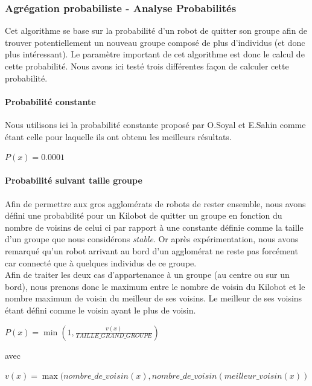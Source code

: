 \documentclass[a4paper]{article}
\begin{document}
\subsubsection{Agrégation probabiliste - Analyse Probabilités}
Cet algorithme se base sur la probabilité d'un robot de quitter son groupe afin de trouver potentiellement un nouveau groupe composé de plus d'individus (et donc plus intéressant). Le paramètre important de cet algorithme est donc le calcul de cette probabilité. Nous avons ici testé trois différentes façon de calculer cette probabilité.
\paragraph{Probabilité constante} Nous utilisons ici la probabilité constante proposé par O.Soyal et E.Sahin comme étant celle pour laquelle ils ont obtenu les meilleurs résultats.
\begin{center}
	$P(x)=0.0001$
\end{center}
\paragraph{Probabilité suivant taille groupe} Afin de permettre aux gros agglomérats de robots de rester ensemble, nous avons défini une probabilité pour un Kilobot de quitter un groupe en fonction du nombre de voisins de celui ci par rapport à une constante définie comme la taille d'un groupe que nous considérons \textit{stable}. Or après expérimentation, nous avons remarqué qu'un robot arrivant au bord d'un agglomérat ne reste pas forcément car connecté que à quelques individus de ce groupe.\\Afin de traiter les deux cas d'appartenance à un groupe (au centre ou sur un bord), nous prenons donc le maximum entre le nombre de voisin du Kilobot et le nombre maximum de voisin du meilleur de ses voisins. Le meilleur de ses voisins étant défini comme le voisin ayant le plus de voisin.
\begin{center}
	$P(x)=\min(1,\frac{v(x)}{TAILLE\_GRAND\_GROUPE})$
\end{center}
avec
\begin{center}
	$v(x)=\max(nombre\_de\_voisin(x),nombre\_de\_voisin(meilleur\_voisin(x))$
\end{center}
\end{document}
